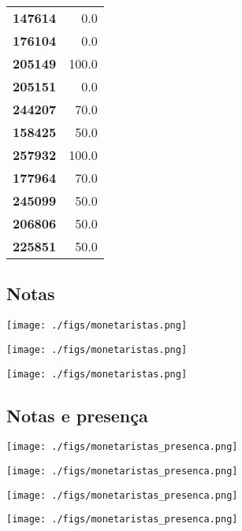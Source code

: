 \documentclass[11pt]{article}
\begin{document}
\begin{center}
\begin{longtable}{lr}
\textbf{147614} &                   0.0 \\
\textbf{176104} &                   0.0 \\
\textbf{205149} &                 100.0 \\
\textbf{205151} &                   0.0 \\
\textbf{244207} &                  70.0 \\
\textbf{158425} &                  50.0 \\
\textbf{257932} &                 100.0 \\
\textbf{177964} &                  70.0 \\
\textbf{245099} &                  50.0 \\
\textbf{206806} &                  50.0 \\
\textbf{225851} &                  50.0 \\
\end{longtable}
\end{center}




\subsection{Notas}
\label{sec:orgb9bce56}
\begin{center}
\texttt{[image: ./figs/monetaristas.png]}
\end{center}
\begin{center}
\texttt{[image: ./figs/monetaristas.png]}
\end{center}
\begin{center}
\texttt{[image: ./figs/monetaristas.png]}
\end{center}



\subsection{Notas e presença}
\label{sec:org7795778}

\begin{center}
\texttt{[image: ./figs/monetaristas\_presenca.png]}
\end{center}
\begin{center}
\texttt{[image: ./figs/monetaristas\_presenca.png]}
\end{center}
\begin{center}
\texttt{[image: ./figs/monetaristas\_presenca.png]}
\end{center}
\begin{center}
\texttt{[image: ./figs/monetaristas\_presenca.png]}
\end{center}
\end{document}

